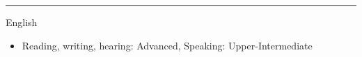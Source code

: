 \documentclass[a4paper,10pt]{article}
\newlength{\cvcolumngapwidth}
\newlength{\cvleftcolumnwidth}
\newlength{\cvrightcolumnwidth}
\newcommand{\cvsectionstyle}[1]{{\normalsize\cvsectionfont\textcolor{cvsectioncolor}{#1}}}
\newcommand{\cvtitlestyle}[1]{{\large\cvtitlefont\textcolor{cvtitlecolor}{#1}}}
\newcommand{\cvdurationstyle}[1]{{\small\cvdurationfont\textcolor{cvdurationcolor}{#1}}}
\newlength{\cvafteritemskipamount}
\newlength{\cvaftersectionskipamount}
\newlength{\cvaftertitleskipamount}
\newlength{\cvparskip}
\newcommand{\cvsection}[1]{
    \begin{minipage}[t]{\cvleftcolumnwidth}
        \raggedleft\cvsectionstyle{#1}
    \end{minipage}%
    \hspace{\cvcolumngapwidth}%
    \begin{minipage}[t]{\cvrightcolumnwidth}
        \textcolor{cvrulecolor}{\rule{\cvrightcolumnwidth}{0.6mm}}
    \end{minipage}

    \vspace{\cvaftersectionskipamount}
}
\newcommand{\cvitem}[2]{
    \begin{minipage}[t]{\cvleftcolumnwidth}
        \raggedleft #1
    \end{minipage}%
    \hspace{\cvcolumngapwidth}%
    \begin{minipage}[t]{\cvrightcolumnwidth}
        \setlength{\parskip}{\cvparskip} #2
    \end{minipage}

    \vspace{\cvafteritemskipamount}
}
\newcommand{\cvtitle}[1]{
    \cvtitlestyle{#1}

    \vspace{\cvaftertitleskipamount}
    \vspace{-\cvparskip}
}
\begin{document}
{\begin{itemize}[leftmargin=*]
        
    \end{itemize}
}

\cvsection{LANGUAGES}

\cvitem{
    \cvdurationstyle{}
}{
    \cvtitle{English}
    \begin{itemize}[leftmargin=*]
        \item Reading, writing, hearing: Advanced, Speaking: Upper-Intermediate
    \end{itemize}
}
\end{document}
